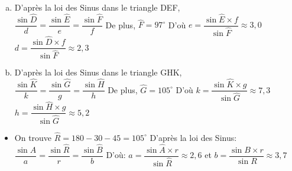 \documentclass[12pt, a4paper]{article}
\begin{document}
\begin{Exercise}[number={144}]
    \begin{enumerate}[a)]
        \item D'après la loi des Sinus dans le triangle DEF, \\ \quad $\dfrac{\sin{\widehat{D}}}{d}=\dfrac{\sin{\widehat{E}}}{e}=\dfrac{\sin{\widehat{F}}}{f}$ \qquad De plus, \quad $\widehat{F}=97^{\circ}$ \medbreak D'où \quad $e=\dfrac{\sin{\widehat{E}}\times f}{\sin{\widehat{F}}}\approx 3{,}0$ \qquad $d=\dfrac{\sin{\widehat{D}}\times f}{\sin{\widehat{F}}}\approx 2{,}3$ \medbreak
        \item D'après la loi des Sinus dans le triangle GHK, \\ \quad $\dfrac{\sin{\widehat{K}}}{k}=\dfrac{\sin{\widehat{G}}}{g}=\dfrac{\sin{\widehat{H}}}{h}$ \qquad De plus, \quad $\widehat{G}=105^{\circ}$ \medbreak D'où \quad $k=\dfrac{\sin{\widehat{K}}\times g}{\sin{\widehat{G}}}\approx 7{,}3$ \qquad $h=\dfrac{\sin{\widehat{H}}\times g}{\sin{\widehat{G}}}\approx 5{,}2$
    \end{enumerate}
\end{Exercise}

\pagebreak

\begin{Exercise}[number={146}]
    \begin{itemize}
        \item[] On trouve $\widehat{R}=180-30-45=105^{\circ}$ \bigbreak
                D'après la loi des Sinus: \qquad $\dfrac{\sin{\widehat{A}}}{a}=\dfrac{\sin{\widehat{R}}}{r}=\dfrac{\sin{\widehat{B}}}{b}$ \medbreak
                D'où: \quad $a=\dfrac{\sin{\widehat{A}\times r}}{\sin{\widehat{R}}}\approx 2{,}6$ \quad et \quad $b=\dfrac{\sin{B}\times r}{\sin{R}}\approx 3{,}7$
    \end{itemize}
\end{Exercise}
\end{document}
